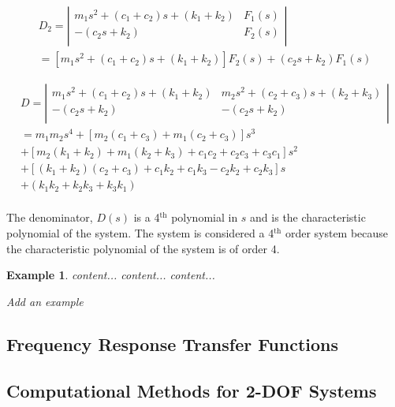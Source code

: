 \documentclass[12pt,letter]{article}
\newtheorem{ex}{Example}
\numberwithin{ex}{section} %
\newenvironment{example}{\begin{mdframed}[middlelinewidth=0.5mm]\begin{ex}\normalfont}{\end{ex}\end{mdframed}}
\numberwithin{re}{section} %
\newcommand{\rd}[1]{\textcolor[rgb]{0.75,0.00,0.00}{#1}}
\begin{document}
\begin{eqnarray}
D_2 = \left|
\begin{array}{cc}
m_1 s^2 + (c_1 + c_2)s + (k_1+k_2)  & F_1(s) \\
-(c_2s+k_2)  & F_2(s) \\
\end{array}
\right| \\
= [m_1 s^2 + (c_1 + c_2)s + (k_1+k_2)]F_2(s) + (c_2s+k_2)F_1(s)  \nonumber
\end{eqnarray}

\begin{eqnarray}
D = \left|
\begin{array}{cc}
m_1 s^2 + (c_1 + c_2)s + (k_1+k_2) & m_2 s^2 + (c_2 + c_3)s + (k_2+k_3) \\
-(c_2s+k_2) & -(c_2s+k_2) \\
\end{array}
\right| \\ \nonumber
= m_1m_2s^4 + [m_2(c_1+c_3)+m_1(c_2+c_3)]s^3 \\  \nonumber
+ [m_2(k_1+k_2)+m_1(k_2+k_3)+c_1c_2+c_2c_3+c_3c_1]s^2 \\  \nonumber
+ [(k_1+k_2)(c_2+c_3)+c_1k_2+c_1k_3-c_2k_2+c_2k_3]s \\  \nonumber
+ (k_1k_2 + k_2k_3 + k_3k_1) \\  \nonumber
\end{eqnarray}

The denominator, $D(s)$ is a 4$^{\text{th}}$ polynomial in $s$ and is the characteristic polynomial of the system. The system is considered a 4$^{\text{th}}$ order system because the characteristic polynomial of the system is of order 4. 

\begin{example}
content...
content...
content...

\rd{Add an example}
\end{example}

\subsection{Frequency Response Transfer Functions}



\subsection{Computational Methods for 2-DOF Systems}
\end{document}
